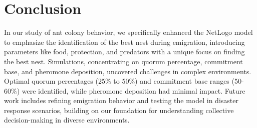 \documentclass[9pt]{pnas-new}
\begin{document}
\section*{Conclusion}
In our study of ant colony behavior, we specifically enhanced the NetLogo model to emphasize the identification of the best nest during emigration, introducing parameters like food, protection, and predators with a unique focus on finding the best nest. Simulations, concentrating on quorum percentage, commitment base, and pheromone deposition, uncovered challenges in complex environments. Optimal quorum percentages (25\% to 50\%) and commitment base ranges (50-60\%) were identified, while pheromone deposition had minimal impact. Future work includes refining emigration behavior and testing the model in disaster response scenarios, building on our foundation for understanding collective decision-making in diverse environments. 

 
\showacknow %


\section*{\bibname}


\end{document}
